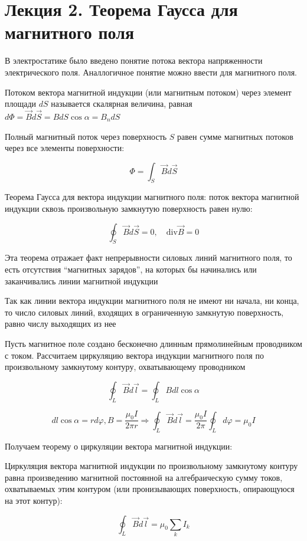 \documentclass[12pt]{article}
\begin{document}






\section{Лекция 2. Теорема Гаусса для магнитного поля}

В электростатике было введено понятие потока вектора напряженности электрического поля. Аналлогичное понятие
можно ввести для магнитного поля. 

\Def Потоком вектора магнитной индукции (или магнитным потоком) через элемент
площади $dS$ называется скалярная величина, равная $d\Phi = \vec{B} d\vec{S} = B dS \cos \alpha = B_n dS$

Полный магнитный поток через поверхность $S$ равен сумме магнитных потоков через все элементы поверхности:

\[\Phi = \int_S \vec{B} d\vec{S}\]

Теорема Гаусса для вектора индукции магнитного поля: поток вектора магнитной индукции сквозь произвольную замкнутую
поверхность равен нулю:

\[\oint_S \vec{B} d\vec{S} = 0, \quad \mathrm{div}\vec{B} = 0\]

Эта теорема отражает факт непрерывности силовых линий магнитного поля, то есть отсутствия \enquote{магнитных зарядов}, 
на которых бы начинались или заканчивались линии магнитной индукции

Так как линии вектора индукции магнитного поля не имеют ни начала, ни конца, то число силовых линий, входящих в 
ограниченную замкнутую поверхность, равно числу выходящих из нее

Пусть магнитное поле создано бесконечно длинным прямолинейным проводником с током. Рассчитаем циркуляцию вектора
индукции магнитного поля по произвольному замкнутому контуру, охватывающему проводником

\[\oint_L \vec{B} d\vec{l} = \oint_L Bdl \cos\alpha\]

\[dl \cos \alpha = r d\varphi, B = \frac{\mu_0 I}{2\pi r} \Longrightarrow \oint_L \vec{B} d\vec{l} = \frac{\mu_0 I}{2\pi} \oint_L d\varphi = \mu_0 I\]

Получаем теорему о циркуляции вектора магнитной индукции: 

\begin{MyTheorem}
    Циркуляция вектора магнитной индукции по произвольному замкнутому
    контуру равна произведению магнитной постоянной на алгебраическую сумму токов, охватываемых этим контуром (или пронизывающих поверхность, опирающуюся на этот контур):

    \[\oint_L \vec{B} d\vec{l} = \mu_0 \sum_k I_k\]
\end{MyTheorem}
\end{document}
